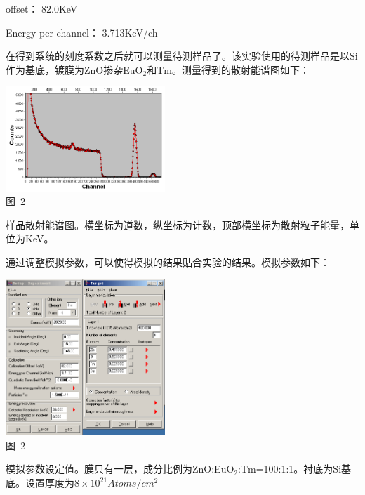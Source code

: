 \documentclass[a4paper,10.0pt,twoside]{npr}
\begin{document}
\begin{multicols}{2}
offset： 82.0KeV

Energy per channel： 3.713KeV/ch

在得到系统的刻度系数之后就可以测量待测样品了。该实验使用的待测样品是以Si作为基底，镀膜为ZnO掺杂EuO$_2$和Tm。测量得到的散射能谱图如下：

\begin{center}
   \includegraphics[width=0.45\textwidth]{1.png}
\\
\xiaowu\song 图~2\begin{minipage}[t]{75mm} \quad 样品散射能谱图。横坐标为道数，纵坐标为计数，顶部横坐标为散射粒子能量，单位为KeV。\\[-1mm]\wuhao
\end{minipage}
\end{center}

通过调整模拟参数，可以使得模拟的结果贴合实验的结果。模拟参数如下：
\begin{center}
   \includegraphics[width=0.45\textwidth]{2.png}
\\
\xiaowu\song 图~2\begin{minipage}[t]{75mm} \quad 模拟参数设定值。膜只有一层，成分比例为ZnO:EuO$_2$:Tm=100:1:1。衬底为Si基底。设置厚度为$8\times10^{21}Atoms/cm^2$\\[-1mm]\wuhao
\end{minipage}
\end{center}


\end{multicols}
\end{document}
